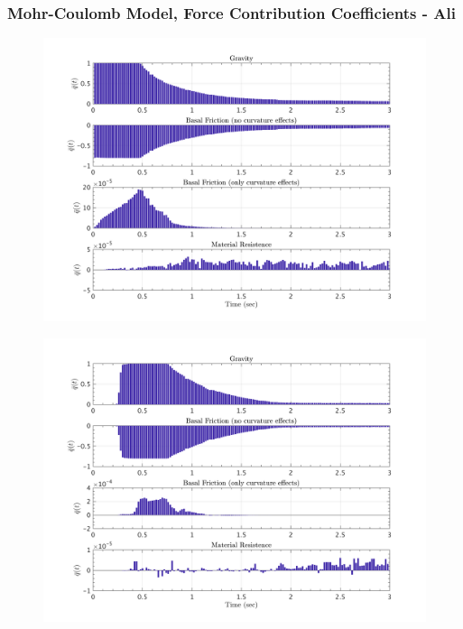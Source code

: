 \documentclass{article}
\begin{document}
\subsubsection{Mohr-Coulomb Model, Force Contribution Coefficients - Ali}
\begin{figure}[H]
        \begin{minipage}[b]{0.5\linewidth}
                \centering
                \includegraphics[width=1\textwidth]{InclinedPlane/LocalRecords/ContribF1_C_x.png}
                \label{fig:Ramp-Cx1}
        \end{minipage}
        \begin{minipage}[b]{0.5\linewidth}
                \centering
                \includegraphics[width=1\textwidth]{InclinedPlane/LocalRecords/ContribF8_C_x.png}
                \label{fig:Ramp-Cx2}
        \end{minipage}


\end{figure}
\end{document}
